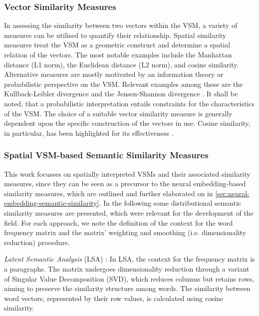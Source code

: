 \documentclass[11pt]{scrreprt}
\let\cite\parencite  %
\begin{document}
\subsubsection{Vector Similarity Measures}
In assessing the similarity between two vectors within the VSM, a variety of measures can be utilised to quantify their relationship. Spatial similarity measures treat the VSM as a geometric construct and determine a spatial relation of the vectors. The most notable examples include the Manhattan distance (L1 norm), the Euclidean distance (L2 norm), and cosine similarity. Alternative measures are mostly motivated by an information theory or probabilistic perspective on the VSM. Relevant examples among these are the Kullback-Leibler divergence and the Jensen-Shannon divergence \cite{mohammadDistributionalMeasuresSemantic2012}. It shall be noted, that a probabilistic interpretation entails constraints for the characteristics of the VSM. The choice of a suitable vector similarity measure is generally dependent upon the specific construction of the vectors in use. Cosine similarity, in particular, has been highlighted for its effectiveness \cite{mohammadDistributionalMeasuresProxies2012, turneyFrequencyMeaningVector2010}. 

\subsubsection{Spatial VSM-based Semantic Similarity Measures}
This work focusses on spatially interpreted VSMs and their associated similarity measures, since they can be seen as a precursor to the neural embedding-based similarity measures, which are outlined and further elaborated on in \cref{sec:neural-embedding-semantic-similarity}.
In the following some distributional semantic similarity measures are presented, which were relevant for the development of the field. For each approach, we note the definition of the context for the word frequency matrix and the matrix' weighting and smoothing  (i.e. dimensionality reduction) procedure. 

\textit{Latent Semantic Analysis} (LSA) \cite{deerwesterIndexingLatentSemantic1990, landauerSolutionPlatoProblem1997, landauerIntroductionLatentSemantic1998}: In LSA, the context for the frequency matrix is a paragraphs. The matrix undergoes dimensionality reduction through a variant of Singular Value Decomposition (SVD), which reduces columns but retains rows, aiming to preserve the similarity structure among words. The similarity between word vectors, represented by their row values, is calculated using cosine similarity.
\end{document}
